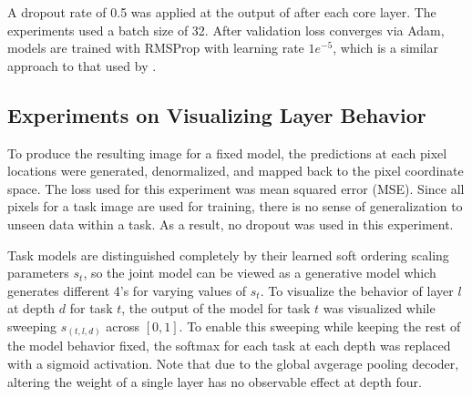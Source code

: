 \documentclass{article}
\theoremstyle{definition}
\theoremstyle{remark}
\begin{document}
A dropout rate of 0.5 was applied at the output of after each core layer.
The experiments used a batch size of 32.
After validation loss converges via Adam, models are trained with RMSProp with learning rate $1e^{-5}$, which is a similar approach to that used by \cite{Gunther:2017}.

\subsection{Experiments on Visualizing Layer Behavior} \label{app:viz}

To produce the resulting image for a fixed model, the predictions at each pixel locations were generated, denormalized, and mapped back to the pixel coordinate space.
The loss used for this experiment was mean squared error (MSE). 
Since all pixels for a task image are used for training, there is no sense of generalization to unseen data within a task.
As a result, no dropout was used in this experiment.

Task models are distinguished completely by their learned soft ordering scaling parameters $s_t$, so the joint model can be viewed as a generative model which generates different 4's for varying values of $s_t$.
To visualize the behavior of layer $l$ at depth $d$ for task $t$, the output of the model for task $t$ was visualized while sweeping $s_{(t,l,d)}$ across $[0,1]$.
To enable this sweeping while keeping the rest of the model behavior fixed, the softmax for each task at each depth was replaced with a sigmoid activation. 
Note that due to the global avgerage pooling decoder, altering the weight of a single layer has no observable effect at depth four. 
\end{document}
